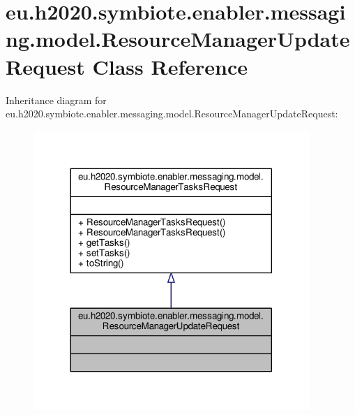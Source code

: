 \hypertarget{classeu_1_1h2020_1_1symbiote_1_1enabler_1_1messaging_1_1model_1_1ResourceManagerUpdateRequest}{}\section{eu.\+h2020.\+symbiote.\+enabler.\+messaging.\+model.\+Resource\+Manager\+Update\+Request Class Reference}
\label{classeu_1_1h2020_1_1symbiote_1_1enabler_1_1messaging_1_1model_1_1ResourceManagerUpdateRequest}


Inheritance diagram for eu.\+h2020.\+symbiote.\+enabler.\+messaging.\+model.\+Resource\+Manager\+Update\+Request\+:
\nopagebreak
\begin{figure}[H]
\begin{center}
\leavevmode
\includegraphics[width=296pt]{classeu_1_1h2020_1_1symbiote_1_1enabler_1_1messaging_1_1model_1_1ResourceManagerUpdateRequest__inherit__graph}
\end{center}
\end{figure}


